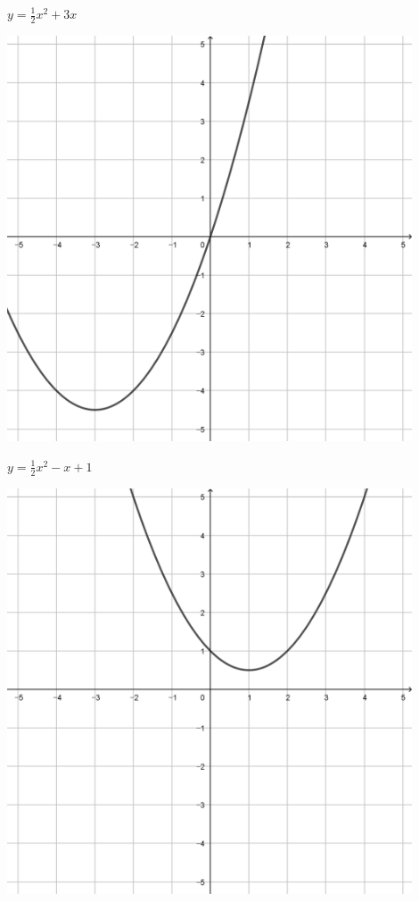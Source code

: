\documentclass[a4paper]{oblivoir}
\begin{document}
\begin{minipage}{0.45\textwidth}\centering
\(y=\frac12x^2+3x\)
\par\bigskip\includegraphics[width=0.9\textwidth]{img/11-5}
\end{minipage}
\begin{minipage}{0.45\textwidth}\centering
\(y=\frac12x^2-x+1\)
\par\bigskip\includegraphics[width=0.9\textwidth]{img/11-6}
\end{minipage}\bigskip\bigskip\par
\end{document}
